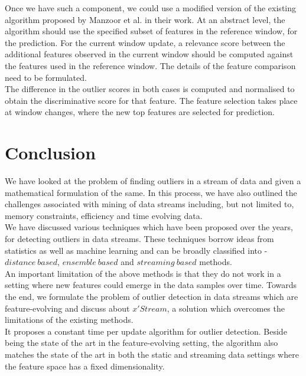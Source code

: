 Once we have such a component, we could use a modified version of the existing algorithm proposed by Manzoor et al. in their work\cite{Manzoor:2018:XOD:3219819.3220107}. At an abstract level, the algorithm should use the specified subset of features in the reference window, for the prediction. For the current window update, a relevance score between the additional features observed in the current window should be computed against the features used in the reference window. The details of the feature comparison need to be formulated. \\

The difference in the outlier scores in both cases is computed and normalised to obtain the discriminative score for that feature. The feature selection takes place at window changes, where the new top features are selected for prediction.

\section{Conclusion}

We have looked at the problem of finding outliers in a stream of data and given a mathematical formulation of the same. In this process, we have also outlined the challenges associated with mining of data streams including, but not limited to, memory constraints, efficiency and time evolving data. \\

We have discussed various techniques which have been proposed over the years, for detecting outliers in data streams. These techniques borrow ideas from statistics as well as machine learning and can be broadly classified into - $distance\ based$, $ensemble\ based$ and $streaming\ based$ methods. \\

An important limitation of the above methods is that they do not work in a setting where new features could emerge in the data samples over time. Towards the end, we formulate the problem of outlier detection in data streams which are feature-evolving and discuss about $x'Stream$, a solution which overcomes the limitations of the existing methods. \\

It proposes a constant time per update algorithm for outlier detection. Beside being the state of the art in the feature-evolving setting, the algorithm also matches the state of the art in both the static and streaming data settings where the feature space has a fixed dimensionality. \\

